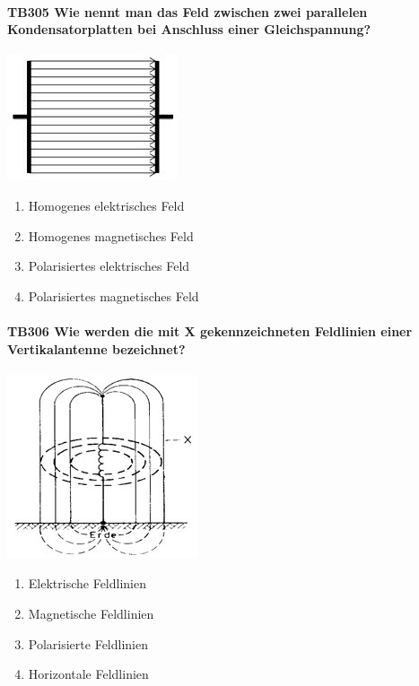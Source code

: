 \documentclass[8pt]{article}
\begin{document}
\begin{enumerate}
\paragraph*{TB305 Wie nennt man das Feld zwischen zwei parallelen Kondensatorplatten bei Anschluss einer Gleichspannung?}
\begin{center}
	\begin{minipage}{\linewidth}
		\centering
		\includegraphics[scale=0.7]{pics/tb305_a.jpg}
	\end{minipage}
\end{center}
\begin{enumerate}[nolistsep,label=\Alph*]
\item Homogenes elektrisches Feld
\item Homogenes magnetisches Feld
\item Polarisiertes elektrisches Feld
\item Polarisiertes magnetisches Feld
\end{enumerate}



\paragraph*{TB306 Wie werden die mit X gekennzeichneten Feldlinien einer Vertikalantenne bezeichnet?}
\begin{center}
	\begin{minipage}{\linewidth}
		\centering
		\includegraphics[scale=0.7]{pics/tb306_a.jpg}
	\end{minipage}
\end{center}
\begin{enumerate}[nolistsep,label=\Alph*]
\item Elektrische Feldlinien
\item Magnetische Feldlinien
\item Polarisierte Feldlinien
\item Horizontale Feldlinien
\end{enumerate}



\end{enumerate}
\end{document}
